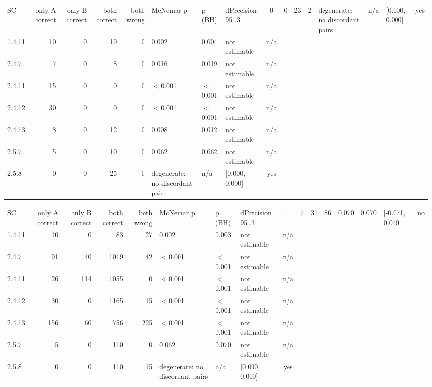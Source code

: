 \begin{tabular}{lrrrrlllc}
\hline
SC & only A correct & only B correct & both correct & both wrong & McNemar p & p (BH) & dPrecision 95%
.3 & 0 & 0 & 23 & 2 & degenerate: no discordant pairs & n/a & [0.000, 0.000] & yes \\
1.4.11 & 10 & 0 & 10 & 0 & 0.002 & 0.004 & not estimable & n/a \\
2.4.7 & 7 & 0 & 8 & 0 & 0.016 & 0.019 & not estimable & n/a \\
2.4.11 & 15 & 0 & 0 & 0 & $<$0.001 & $<$0.001 & not estimable & n/a \\
2.4.12 & 30 & 0 & 0 & 0 & $<$0.001 & $<$0.001 & not estimable & n/a \\
2.4.13 & 8 & 0 & 12 & 0 & 0.008 & 0.012 & not estimable & n/a \\
2.5.7 & 5 & 0 & 10 & 0 & 0.062 & 0.062 & not estimable & n/a \\
2.5.8 & 0 & 0 & 25 & 0 & degenerate: no discordant pairs & n/a & [0.000, 0.000] & yes \\
\hline
\end{tabular}

\begin{tabular}{lrrrrlllc}
\hline
SC & only A correct & only B correct & both correct & both wrong & McNemar p & p (BH) & dPrecision 95%
.3 & 1 & 7 & 31 & 86 & 0.070 & 0.070 & [-0.071, 0.040] & no \\
1.4.11 & 10 & 0 & 83 & 27 & 0.002 & 0.003 & not estimable & n/a \\
2.4.7 & 91 & 40 & 1019 & 42 & $<$0.001 & $<$0.001 & not estimable & n/a \\
2.4.11 & 26 & 114 & 1055 & 0 & $<$0.001 & $<$0.001 & not estimable & n/a \\
2.4.12 & 30 & 0 & 1165 & 15 & $<$0.001 & $<$0.001 & not estimable & n/a \\
2.4.13 & 156 & 60 & 756 & 225 & $<$0.001 & $<$0.001 & not estimable & n/a \\
2.5.7 & 5 & 0 & 110 & 0 & 0.062 & 0.070 & not estimable & n/a \\
2.5.8 & 0 & 0 & 110 & 15 & degenerate: no discordant pairs & n/a & [0.000, 0.000] & yes \\
\hline
\end{tabular}

